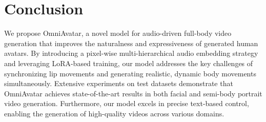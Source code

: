 \section{Conclusion}

We propose OmniAvatar, a novel model for audio-driven full-body video generation that improves the naturalness and expressiveness of generated human avatars. By introducing a pixel-wise multi-hierarchical audio embedding strategy and leveraging LoRA-based training, our model addresses the key challenges of synchronizing lip movements and generating realistic, dynamic body movements simultaneously. Extensive experiments on test datasets demonstrate that OmniAvatar achieves state-of-the-art results in both facial and semi-body portrait video generation. Furthermore, our model excels in precise text-based control, enabling the generation of high-quality videos across various domains.